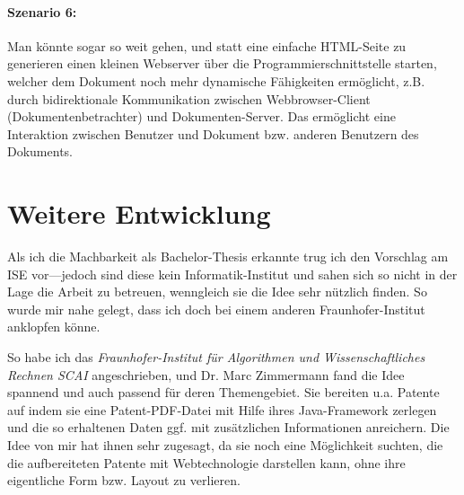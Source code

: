 \paragraph{Szenario 6:} Man könnte sogar so weit gehen, und statt eine einfache
HTML-Seite zu generieren einen kleinen Webserver über die
Programmierschnittstelle starten, welcher dem Dokument noch
mehr dynamische Fähigkeiten ermöglicht, z.B. durch bidirektionale
Kommunikation zwischen Webbrowser-Client (Dokumentenbetrachter) und
Dokumenten-Server. Das ermöglicht eine Interaktion zwischen Benutzer und
Dokument bzw. anderen Benutzern des Dokuments.





\section{Weitere Entwicklung}

Als ich die Machbarkeit als Bachelor-Thesis erkannte trug ich den
Vorschlag am ISE vor---jedoch sind
diese kein Informatik-Institut und sahen sich so nicht in der Lage die Arbeit
zu betreuen, wenngleich sie die Idee sehr nützlich finden. So wurde mir
nahe gelegt, dass ich doch bei einem anderen Fraunhofer-Institut anklopfen
könne.

So habe ich das \emph{Fraunhofer-Institut für Algorithmen und Wissenschaftliches
Rechnen SCAI} angeschrieben, und Dr. Marc Zimmermann fand
die Idee spannend und auch passend für deren Themengebiet. Sie bereiten u.a.
Patente auf indem sie eine Patent-PDF-Datei mit Hilfe ihres Java-Framework
zerlegen und die so erhaltenen Daten ggf. mit zusätzlichen Informationen
anreichern. Die Idee von mir hat ihnen sehr zugesagt, da sie noch eine
Möglichkeit suchten, die die aufbereiteten Patente mit Webtechnologie
darstellen kann, ohne ihre eigentliche Form bzw. Layout zu verlieren.

